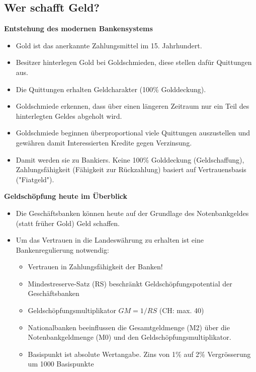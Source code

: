 \subsection{Wer schafft Geld?}
\begin{minipage}{0.6\linewidth}
	\textbf{Entstehung des modernen Bankensystems}
	\begin{itemize}
		\item Gold ist das anerkannte Zahlungsmittel im 15. Jahrhundert.
		\item Besitzer hinterlegen Gold bei Goldschmieden, diese stellen dafür Quittungen aus.
		\item Die Quittungen erhalten Geldcharakter (100\% Golddeckung).
		\item Goldschmiede erkennen, dass über einen längeren Zeitraum nur ein Teil des hinterlegten Geldes abgeholt wird.
		\item Goldschmiede beginnen überproportional viele Quittungen auszustellen und gewähren damit Interessierten Kredite gegen Verzinsung.
		\item Damit werden sie zu Bankiers. Keine 100\% Golddeckung (Geldschaffung), Zahlungsfähigkeit (Fähigkeit zur Rückzahlung) basiert auf Vertrauensbasis ("Fiatgeld").
	\end{itemize}
	\textbf{Geldschöpfung heute im Überblick}
	\begin{itemize}
		\item Die Geschäftsbanken können heute auf der Grundlage des Notenbankgeldes (statt früher Gold) Geld schaffen.
		\item Um das Vertrauen in die Landeswährung zu erhalten ist eine Bankenregulierung notwendig:
		\begin{itemize}
			\item Vertrauen in Zahlungsfähigkeit der Banken!
			\item Mindestreserve-Satz (RS) beschränkt Geldschöpfungspotential der Geschäftsbanken
			\item Geldschöpfungsmultiplikator $GM= 1/RS$ (CH: max. 40)
			\item Nationalbanken beeinflussen die Gesamtgeldmenge (M2) über die Notenbankgeldmenge (M0) und den Geldschöpfungsmultiplikator.
			\item Basispunkt ist absolute Wertangabe.
			\subitem Zins von 1\% auf 2\% Vergrösserung um 1000 Basispunkte
		\end{itemize}
	\end{itemize}
\end{minipage}%
